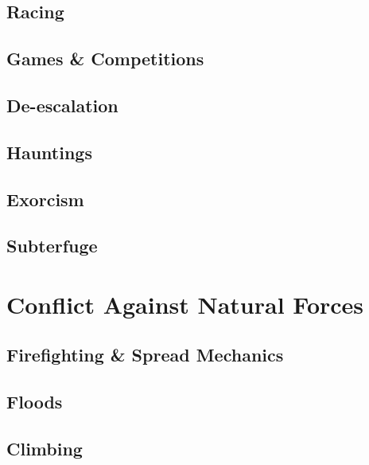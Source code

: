 \documentclass[twocolumn]{dndbook}
\begin{document}
\subsection{Racing}
\subsection{Games \& Competitions}
\subsection{De-escalation}


\subsection{Hauntings}
\subsection{Exorcism}
\subsection{Subterfuge}


\section{Conflict Against Natural Forces}
\subsection{Firefighting \& Spread Mechanics}
\subsection{Floods}
\subsection{Climbing}
\end{document}
